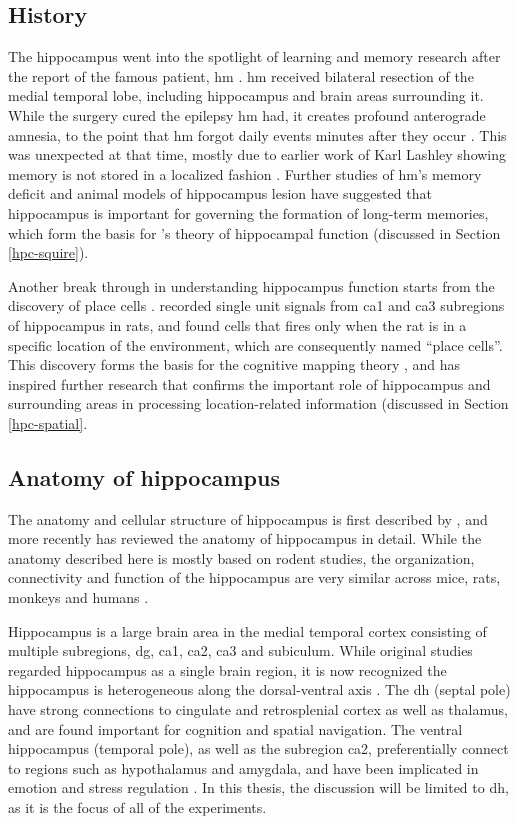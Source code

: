 \subsection{History}
The hippocampus went into the spotlight of learning and memory research after the report of the famous patient, \gls{hm} \citep{scoville57, squire09}. \Gls{hm} received bilateral resection of the medial temporal lobe, including hippocampus and brain areas surrounding it. While the surgery cured the epilepsy \gls{hm} had, it creates profound anterograde amnesia, to the point that \gls{hm} forgot daily events minutes after they occur \citep{scoville57, squire09}. This was unexpected at that time, mostly due to earlier work of Karl Lashley showing memory is not stored in a localized fashion \citep{bruce01}. Further studies of \gls{hm}'s memory deficit and animal models of hippocampus lesion have suggested that hippocampus is important for governing the formation of long-term memories, which form the basis for \citet{squire91}'s theory of hippocampal function (discussed in Section \ref{hpc-squire}).

Another break through in understanding hippocampus function starts from the discovery of place cells \citep{o'keefe71}. \citet{o'keefe71} recorded single unit signals from \gls{ca1} and \gls{ca3} subregions of hippocampus in rats, and found cells that fires only when the rat is in a specific location of the environment, which are consequently named ``place cells''. This discovery forms the basis for the cognitive mapping theory \citep{o'keefe76}, and has inspired further research that confirms the important role of hippocampus and surrounding areas in processing location-related information (discussed in Section \ref{hpc-spatial}.

\subsection{Anatomy of hippocampus}
The anatomy and cellular structure of hippocampus is first described by \citet{cajal93}, and more recently \citet{strien09} has reviewed the anatomy of hippocampus in detail. While the anatomy described here is mostly based on rodent studies, the organization, connectivity and function of the hippocampus are very similar across mice, rats, monkeys and humans \citep{clark13}. 

Hippocampus is a large brain area in the medial temporal cortex consisting of multiple subregions, \gls{dg}, \gls{ca1}, \gls{ca2}, \gls{ca3} and subiculum. While original studies regarded hippocampus as a single brain region, it is now recognized the hippocampus is heterogeneous along the dorsal-ventral axis \citep{moser98, fanselow10}. The \gls{dh} (septal pole) have strong connections to cingulate and retrosplenial cortex as well as thalamus, and are found important for cognition and spatial navigation. The ventral hippocampus (temporal pole), as well as the subregion \gls{ca2}, preferentially connect to regions such as hypothalamus and amygdala, and have been implicated in emotion and stress regulation \citep{fanselow10, chevaleyre16}. In this thesis, the discussion will be limited to \gls{dh}, as it is the focus of all of the experiments.

